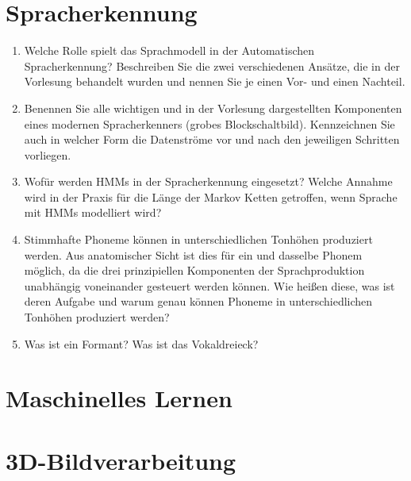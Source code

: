 \section{Spracherkennung}
\begin{enumerate}
	\item Welche Rolle spielt das Sprachmodell in der Automatischen Spracherkennung? Beschreiben Sie die zwei verschiedenen Ansätze, die in der Vorlesung behandelt wurden und nennen Sie je einen Vor- und einen Nachteil.
	\item Benennen Sie alle wichtigen und in der Vorlesung dargestellten Komponenten eines modernen Spracherkenners (grobes Blockschaltbild). Kennzeichnen Sie auch in welcher Form die Datenströme vor und nach den jeweiligen Schritten vorliegen.
	\item Wofür werden HMMs in der Spracherkennung eingesetzt? Welche Annahme wird in der Praxis für die Länge der Markov Ketten getroffen, wenn Sprache mit HMMs modelliert wird?
	\item Stimmhafte Phoneme können in unterschiedlichen Tonhöhen produziert werden. Aus anatomischer Sicht ist dies für ein und dasselbe Phonem möglich, da die drei prinzipiellen Komponenten der Sprachproduktion unabhängig voneinander gesteuert werden können. Wie heißen diese, was ist deren Aufgabe und warum genau können Phoneme in unterschiedlichen Tonhöhen produziert werden?
	\item Was ist ein Formant? Was ist das Vokaldreieck?
\end{enumerate}
\section{Maschinelles Lernen}
\section{3D-Bildverarbeitung}
